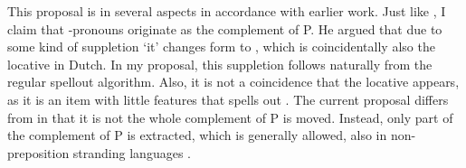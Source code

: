 \documentclass[12pt]{article}
\begin{document}
This proposal is in several aspects in accordance with earlier work.
Just like \citet{riemsdijk1978}, I claim that -pronouns originate as the complement of P. He argued that due to some kind of suppletion  `it' changes form to , which is coincidentally also the locative in Dutch. In my proposal, this suppletion follows naturally from the regular spellout algorithm. Also, it is not a coincidence that the locative appears, as it is an item with little features that spells out .
The current proposal differs from \citet{riemsdijk1978} in that it is not the whole complement of P is moved. Instead, only part of the complement of P is extracted, which is generally allowed, also in non-preposition stranding languages \citep{abels2003diss}.



\printbibliography
\end{document}
